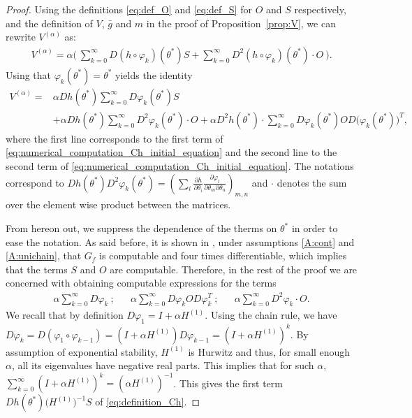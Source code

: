 \documentclass{article}
\newcommand\toA{^{(\alpha)}}
\begin{document}
\begin{proof}
    Using the definitions \eqref{eq:def_O} and \eqref{eq:def_S} for $O$ and $S$ respectively, and the definition of $V$, $\bar{g}$ and $m$ in the proof of Proposition~\ref{prop:V}, we can rewrite $V\toA$ as:
    \begin{align}
        V\toA = \alpha\bigl( ~ \sum_{k=0}^\infty D (h \circ \varphi_k)(\theta^{*}) S + \sum_{k=0}^\infty D^2 (h \circ \varphi_k)(\theta^{*}) \cdot O ~ \bigr). \label{eq:numerical_computation_Ch_initial_equation}
    \end{align} 
    Using that $\varphi_k(\theta^{*}) = \theta^{*}$ yields the identity 
    \begin{align}
        V^{(\alpha)} = &\alpha D h(\theta^*) \sum_{k=0}^\infty D \varphi_k(\theta^*) S \\
        &+ \alpha D h(\theta^*) \sum_{k=0}^\infty D^2 \varphi_k(\theta^*) \cdot O + \alpha D^2 h(\theta^*) \cdot \sum_{k=0}^\infty D \varphi_k(\theta^*) O D \bigl(\varphi_k(\theta^*)\bigr)^T,\label{eq:derivatives_proof_computational}
    \end{align}
    where the first line corresponds to the first term of \eqref{eq:numerical_computation_Ch_initial_equation} and the second line to the second term of \eqref{eq:numerical_computation_Ch_initial_equation}. The notations correspond to $D h(\theta^*)  D^2 \varphi_k (\theta^*) = (\sum_i \frac{\partial h}{\partial \theta_i} \frac{\partial \varphi_i}{\partial \theta_m \partial \theta_n})_{m,n}$ and $\cdot$ denotes the sum over the element wise product between the matrices.

    From hereon out, we suppress the dependence of the therms on $\theta^*$ in order to ease the notation. As said before, it is shown in \cite[Lemma~4]{allmeier2023bias}, under assumptions \ref{A:cont} and \ref{A:unichain}, that $G_f$ is computable and four times differentiable, which implies that the terms $S$ and $O$ are computable. Therefore, in the rest of the proof we are concerned with obtaining computable expressions for the terms 
    \begin{align}
        \alpha\sum_{k=0}^\infty D \varphi_k \ ; && \alpha\sum_{k=0}^\infty D \varphi_k O D \varphi_k^T \ ; && \alpha\sum_{k=0}^\infty D^2 \varphi_k\cdot O. \label{eq:infinite_sum_computable_lemma}
    \end{align}
    We recall that by definition $D \varphi_1 = I + \alpha H^{(1)}$. Using the chain rule, we have $D \varphi_k = D (\varphi_1 \circ \varphi_{k-1}) = (I + \alpha H^{(1)}) D \varphi_{k-1} = (I +\alpha H^{(1)})^k$. By assumption of exponential stability, $H^{(1)}$ is Hurwitz and thus, for small enough $\alpha$, all its eigenvalues have negative real parts. This implies that for such $\alpha$, $\sum_{k=0}^\infty (I +\alpha H^{(1)})^k = (\alpha H^{(1)})^{-1}$. This gives the first term $D h(\theta^*) \bigl(H^{(1)}\bigr)^{-1} S$ of \eqref{eq:definition_Ch}.
    

\end{proof}
\end{document}
